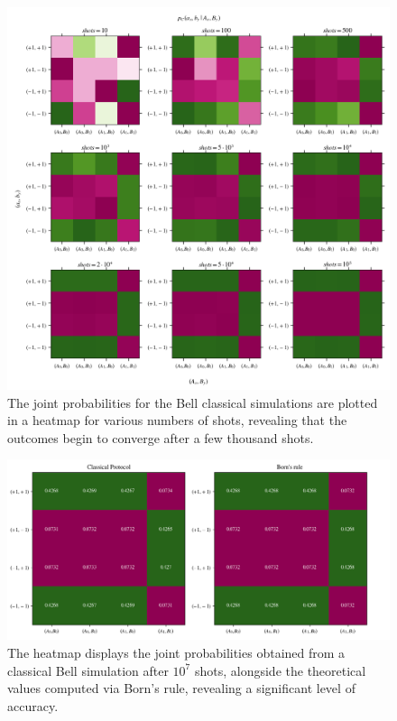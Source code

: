 \begin{figure}[h!]
\centering
\includegraphics[width=\textwidth]{images/bell_heatmap_classical.png}
\caption{The joint probabilities for the Bell classical simulations are plotted in a heatmap for various numbers of shots, revealing that the outcomes begin to converge after a few thousand shots.}
\label{fig:classical_results_bell}
\end{figure}

\begin{figure}[h!]
\centering
\includegraphics[width=\textwidth]{images/bell_heatmap_classical_theoretical.png}
\caption{The heatmap displays the joint probabilities obtained from a classical Bell simulation after $10^7$ shots, alongside the theoretical values computed via Born's rule, revealing a significant level of accuracy.}
\label{fig:classical_theoretical_results_bell}
\end{figure}
\clearpage
